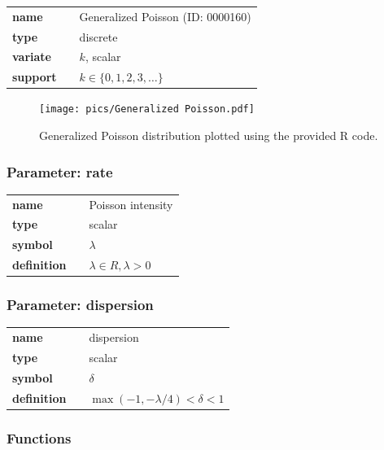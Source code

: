 \documentclass{article}
\begin{document}
  \bigskip 

\begin{tabular}{p{2cm}cl}
\textbf{name} & & Generalized Poisson (ID: 0000160)\\ 
 
\textbf{type} & & discrete \\ 

\textbf{variate} & & $k
$, scalar \\ 

\textbf{support} & & $k \in \{0,1,2,3,\dots\}$
\end{tabular}

\begin{figure}[ht!]
\centering
  \texttt{[image: pics/Generalized Poisson.pdf]}
 \caption{Generalized Poisson distribution plotted using the provided R code.}
 \label{fig:Generalized Poisson}
\end{figure}

\subsubsection*{Parameter: rate}

\noindent\begin{tabular}{p{2cm}cl}
\textbf{name} & & Poisson intensity \\
\textbf{type} & & scalar \\
\textbf{symbol} & & $\lambda$  \\
\textbf{definition} & & $\lambda \in R, \lambda > 0$
\end{tabular}
\subsubsection*{Parameter: dispersion}

\noindent\begin{tabular}{p{2cm}cl}
\textbf{name} & & dispersion \\
\textbf{type} & & scalar \\
\textbf{symbol} & & $\delta$  \\
\textbf{definition} & & $\max(-1,-\lambda/4) < \delta < 1$
\end{tabular}
\subsubsection*{Functions}
\end{document}
